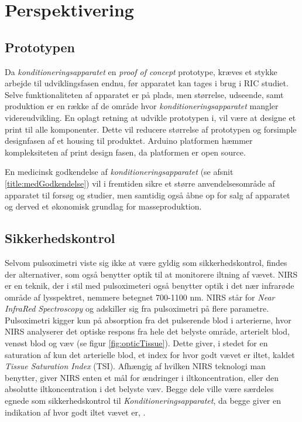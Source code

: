 \chapter{Perspektivering} 

\section{Prototypen}
Da \textit{konditioneringsapparatet} en \textit{proof of concept} prototype, kræves et stykke arbejde til udviklingsfasen endnu, før apparatet kan tages i brug i RIC studiet. Selve funktionaliteten af apparatet er på plads, men størrelse, udseende, samt produktion er en række af de område hvor \textit{konditioneringsapparatet} mangler videreudvikling. En oplagt retning at udvikle prototypen i, vil være at designe et print til alle komponenter. Dette vil reducere størrelse af prototypen og forsimple designfasen af et housing til produktet. Arduino platformen hæmmer kompleksiteten af print design fasen, da platformen er open source. 

En medicinsk godkendelse af \textit{konditioneringsapparatet} (se afsnit \ref{title:medGodkendelse}) vil i fremtiden sikre et større anvendelsesområde af apparatet til forsøg og studier, men samtidig også åbne op for salg af apparatet og derved et økonomisk grundlag for masseproduktion.

\section{Sikkerhedskontrol}\label{title:nirs}
Selvom pulsoximetri viste sig ikke at være gyldig som sikkerhedskontrol, findes der alternativer, som også benytter optik til at monitorere iltning af vævet. NIRS er en teknik, der i stil med pulsoximeteri også benytter optik i det nær infrarøde område af lysspektret, nemmere betegnet 700-1100 nm. NIRS står for \textit{Near InfraRed Spectroscopy} og adskiller sig fra pulsoximetri på flere parametre. Pulsoximetri kigger kun på absorption fra det pulserende blod i arterierne, hvor NIRS analyserer det optiske respons fra hele det belyste område, arterielt blod, venøst blod og væv (se figur \ref{fig:opticTissue}). Dette giver, i stedet for en saturation af kun det arterielle blod, et index for hvor godt vævet er iltet, kaldet \textit{Tissue Saturation Index} (TSI). Afhængig af hvilken NIRS teknologi man benytter, giver NIRS enten et mål for ændringer i iltkoncentration, eller den absolutte iltkoncentration i det belyste væv. Begge dele ville være særdeles egnede som sikkerhedskontrol til \textit{Konditioneringsapparatet}, da begge giver en indikation af hvor godt iltet vævet er, \cite{RefWorks:22} .


